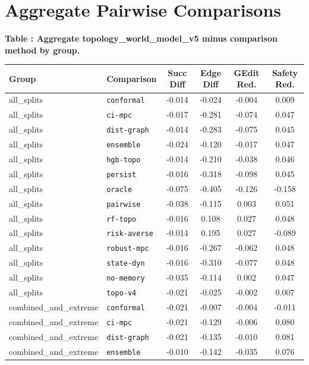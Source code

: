 \documentclass{article}
\begin{document}
\section{Aggregate Pairwise Comparisons}
\tiny
\begin{center}
\label{tab:aggregatepair}\textbf{Table \thetable: Aggregate topology\_world\_model\_v5 minus comparison method by group.}\\[0.4ex]
\begin{tabular}{llcccc}
\toprule
Group & Comparison & Succ Diff & Edge Diff & GEdit Red. & Safety Red. \\
\midrule
all\_splits & \texttt{conformal} & -0.014 & -0.024 & -0.004 & 0.009 \\
all\_splits & \texttt{ci-mpc} & -0.017 & -0.281 & -0.074 & 0.047 \\
all\_splits & \texttt{dist-graph} & -0.014 & -0.283 & -0.075 & 0.045 \\
all\_splits & \texttt{ensemble} & -0.024 & -0.120 & -0.017 & 0.047 \\
all\_splits & \texttt{hgb-topo} & -0.014 & -0.210 & -0.038 & 0.046 \\
all\_splits & \texttt{persist} & -0.016 & -0.318 & -0.098 & 0.045 \\
all\_splits & \texttt{oracle} & -0.075 & -0.405 & -0.126 & -0.158 \\
all\_splits & \texttt{pairwise} & -0.038 & -0.115 & 0.003 & 0.051 \\
all\_splits & \texttt{rf-topo} & -0.016 & 0.108 & 0.027 & 0.048 \\
all\_splits & \texttt{risk-averse} & -0.014 & 0.195 & 0.027 & -0.089 \\
all\_splits & \texttt{robust-mpc} & -0.016 & -0.267 & -0.062 & 0.048 \\
all\_splits & \texttt{state-dyn} & -0.016 & -0.310 & -0.077 & 0.048 \\
all\_splits & \texttt{no-memory} & -0.035 & -0.114 & 0.002 & 0.047 \\
all\_splits & \texttt{topo-v4} & -0.021 & -0.025 & -0.002 & 0.007 \\
combined\_and\_extreme & \texttt{conformal} & -0.021 & -0.007 & -0.004 & -0.011 \\
combined\_and\_extreme & \texttt{ci-mpc} & -0.021 & -0.129 & -0.006 & 0.080 \\
combined\_and\_extreme & \texttt{dist-graph} & -0.021 & -0.135 & -0.010 & 0.081 \\
combined\_and\_extreme & \texttt{ensemble} & -0.010 & -0.142 & -0.035 & 0.076 \\

\end{tabular}
\end{center}
\end{document}
